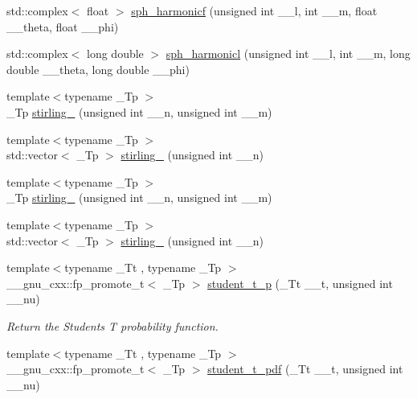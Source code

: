 \begin{DoxyCompactItemize}
\item 
std\+::complex$<$ float $>$ \hyperlink{group__gnu__math__spec__func_ga062b1156f5646fe42719439bb3dcc9e5}{sph\+\_\+harmonicf} (unsigned int \+\_\+\+\_\+l, int \+\_\+\+\_\+m, float \+\_\+\+\_\+theta, float \+\_\+\+\_\+phi)
\item 
std\+::complex$<$ long double $>$ \hyperlink{group__gnu__math__spec__func_ga414c8374b4579aa14e38f5401304b6fa}{sph\+\_\+harmonicl} (unsigned int \+\_\+\+\_\+l, int \+\_\+\+\_\+m, long double \+\_\+\+\_\+theta, long double \+\_\+\+\_\+phi)
\item 
{\footnotesize template$<$typename \+\_\+\+Tp $>$ }\\\+\_\+\+Tp \hyperlink{group__gnu__math__spec__func_ga2b955dac7d2c5125f2091eaeb25c8ad2}{stirling\+\_} (unsigned int \+\_\+\+\_\+n, unsigned int \+\_\+\+\_\+m)
\item 
{\footnotesize template$<$typename \+\_\+\+Tp $>$ }\\std\+::vector$<$ \+\_\+\+Tp $>$ \hyperlink{group__gnu__math__spec__func_gaff3d42b2ec5364d24c1ad0ef4b374a8d}{stirling\+\_} (unsigned int \+\_\+\+\_\+n)
\item 
{\footnotesize template$<$typename \+\_\+\+Tp $>$ }\\\+\_\+\+Tp \hyperlink{group__gnu__math__spec__func_ga3761c0e467cbe45cbda66a4e796adcd3}{stirling\+\_} (unsigned int \+\_\+\+\_\+n, unsigned int \+\_\+\+\_\+m)
\item 
{\footnotesize template$<$typename \+\_\+\+Tp $>$ }\\std\+::vector$<$ \+\_\+\+Tp $>$ \hyperlink{group__gnu__math__spec__func_ga6a2386b3e0940935f10a163baa925656}{stirling\+\_} (unsigned int \+\_\+\+\_\+n)
\item 
{\footnotesize template$<$typename \+\_\+\+Tt , typename \+\_\+\+Tp $>$ }\\\+\_\+\+\_\+gnu\+\_\+cxx\+::fp\+\_\+promote\+\_\+t$<$ \+\_\+\+Tp $>$ \hyperlink{group__gnu__math__spec__func_ga5a84386b009ac57a726d5d0314fdf7ce}{student\+\_\+t\+\_\+p} (\+\_\+\+Tt \+\_\+\+\_\+t, unsigned int \+\_\+\+\_\+nu)
\begin{DoxyCompactList}\small\item\em Return the Students T probability function. \end{DoxyCompactList}\item 
{\footnotesize template$<$typename \+\_\+\+Tt , typename \+\_\+\+Tp $>$ }\\\+\_\+\+\_\+gnu\+\_\+cxx\+::fp\+\_\+promote\+\_\+t$<$ \+\_\+\+Tp $>$ \hyperlink{group__gnu__math__spec__func_ga95a4c03cf0a8104e9a15a35acfe5fb3a}{student\+\_\+t\+\_\+pdf} (\+\_\+\+Tt \+\_\+\+\_\+t, unsigned int \+\_\+\+\_\+nu)

\end{DoxyCompactItemize}
